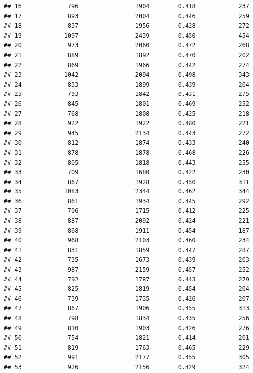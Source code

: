 \documentclass[]{book}
\begin{document}
\begin{verbatim}
## 16             796                1904        0.418            237
## 17             893                2004        0.446            259
## 18             837                1956        0.428            272
## 19            1097                2439        0.450            454
## 20             973                2060        0.472            268
## 21             889                1892        0.470            202
## 22             869                1966        0.442            274
## 23            1042                2094        0.498            343
## 24             833                1899        0.439            204
## 25             793                1842        0.431            275
## 26             845                1801        0.469            252
## 27             768                1808        0.425            218
## 28             922                1922        0.480            221
## 29             945                2134        0.443            272
## 30             812                1874        0.433            240
## 31             878                1878        0.468            226
## 32             805                1818        0.443            255
## 33             709                1680        0.422            230
## 34             867                1928        0.450            311
## 35            1083                2344        0.462            344
## 36             861                1934        0.445            292
## 37             706                1715        0.412            225
## 38             887                2092        0.424            221
## 39             868                1911        0.454            187
## 40             968                2103        0.460            234
## 41             831                1859        0.447            287
## 42             735                1673        0.439            203
## 43             987                2159        0.457            252
## 44             792                1787        0.443            279
## 45             825                1819        0.454            204
## 46             739                1735        0.426            207
## 47             867                1906        0.455            313
## 48             798                1834        0.435            256
## 49             810                1903        0.426            276
## 50             754                1821        0.414            201
## 51             819                1763        0.465            229
## 52             991                2177        0.455            305
## 53             926                2156        0.429            324

\end{verbatim}
\end{document}
